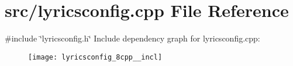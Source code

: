 \section{src/lyricsconfig.cpp File Reference}
\label{lyricsconfig_8cpp}
{\ttfamily \#include \char`\"{}lyricsconfig.\+h\char`\"{}}\newline
Include dependency graph for lyricsconfig.\+cpp\+:\nopagebreak
\begin{figure}[H]
\begin{center}
\leavevmode
\texttt{[image: lyricsconfig\_8cpp\_\_incl]}
\end{center}
\end{figure}
